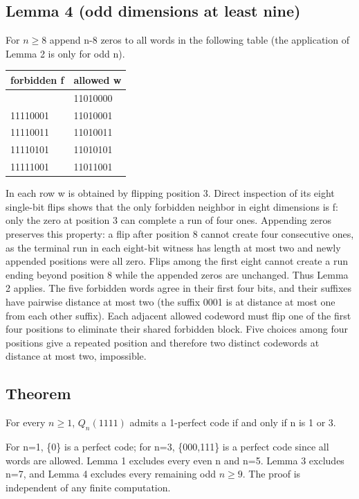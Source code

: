 \documentclass[
]{article}
\begin{document}
\subsection{Lemma 4 (odd dimensions at least
nine)}\label{lemma-4-odd-dimensions-at-least-nine}

For \(n\geq 8\) append n-8 zeros to all words in the following table
(the application of Lemma 2 is only for odd n).

\begin{longtable}[]{@{}ll@{}}
\toprule\noalign{}
forbidden f & allowed w \\
\midrule\noalign{}
\endhead
\bottomrule\noalign{}
\endlastfoot
11110000 & 11010000 \\
11110001 & 11010001 \\
11110011 & 11010011 \\
11110101 & 11010101 \\
11111001 & 11011001 \\
\end{longtable}

In each row w is obtained by flipping position 3. Direct inspection of
its eight single-bit flips shows that the only forbidden neighbor in
eight dimensions is f: only the zero at position 3 can complete a run of
four ones. Appending zeros preserves this property: a flip after
position 8 cannot create four consecutive ones, as the terminal run in
each eight-bit witness has length at most two and newly appended
positions were all zero. Flips among the first eight cannot create a run
ending beyond position 8 while the appended zeros are unchanged. Thus
Lemma 2 applies. The five forbidden words agree in their first four
bits, and their suffixes have pairwise distance at most two (the suffix
0001 is at distance at most one from each other suffix). Each adjacent
allowed codeword must flip one of the first four positions to eliminate
their shared forbidden block. Five choices among four positions give a
repeated position and therefore two distinct codewords at distance at
most two, impossible.

\subsection{Theorem}\label{theorem}

For every \(n\geq 1\), \(Q_n(1111)\) admits a 1-perfect code if and only
if n is 1 or 3.

For n=1, \{0\} is a perfect code; for n=3, \{000,111\} is a perfect code
since all words are allowed. Lemma 1 excludes every even n and n=5.
Lemma 3 excludes n=7, and Lemma 4 excludes every remaining odd
\(n\geq 9\). The proof is independent of any finite computation.
\end{document}

